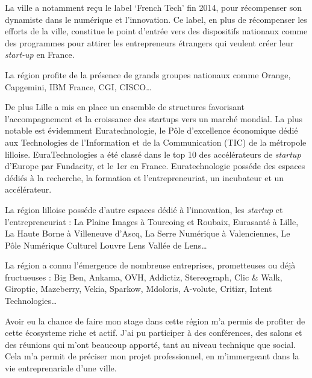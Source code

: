 \documentclass[12pt,a4paper]{article}
\begin{document}
  \bigskip

  La ville a notamment reçu le label `French Tech' fin 2014, pour
  récompenser son dynamiste dans le numérique et l'innovation. Ce label,
  en plus de récompenser les efforts de la ville, constitue le point
  d'entrée vers des dispositifs nationaux comme des programmes pour
  attirer les entrepreneurs étrangers qui veulent créer leur
  \emph{start-up} en France.

  \bigskip

  La région profite de la présence de grands groupes nationaux comme
  Orange, Capgemini, IBM France, CGI, CISCO\ldots{}

  \bigskip

  De plus Lille a mis en place un ensemble de structures favorisant
  l'accompagnement et la croissance des startups vers un marché mondial.
  La plus notable est évidemment Euratechnologie, le Pôle d'excellence
  économique dédié aux Technologies de l'Information et de la
  Communication (TIC) de la métropole lilloise. EuraTechnologies a été
  classé dans le top 10 des accélérateurs de \emph{startup} d'Europe par
  Fundacity, et le 1er en France. Euratechnologie posséde des espaces
  dédiés à la recherche, la formation et l'entrepreneuriat, un incubateur
  et un accélérateur.

  \bigskip

  La région lilloise posséde d'autre espaces dédié à l'innovation, les
  \emph{startup} et l'entrepreneuriat : La Plaine Images à Tourcoing et
  Roubaix, Eurasanté à Lille, La Haute Borne à Villeneuve d'Ascq, La Serre
  Numérique à Valenciennes, Le Pôle Numérique Culturel Louvre Lens Vallée
  de Lens\ldots{}

  \bigskip

  La région a connu l'émergence de nombreuse entreprises, prometteuses ou
  déjà fructueuses : Big Ben, Ankama, OVH, Addictiz, Stereograph, Clic \&
  Walk, Giroptic, Mazeberry, Vekia, Sparkow, Mdoloris, A-volute, Critizr,
  Intent Technologies\ldots{}

  \bigskip

  Avoir eu la chance de faire mon stage dans cette région m'a permis de
  profiter de cette écosysteme riche et actif. J'ai pu participer à des
  conférences, des salons et des réunions qui m'ont beaucoup apporté, tant
  au niveau technique que social. Cela m'a permit de préciser mon projet
  professionnel, en m'immergeant dans la vie entreprenariale d'une ville.

  \bigskip
\end{document}
